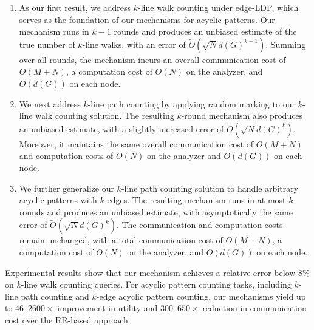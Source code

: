 \begin{enumerate}
\item 
As our first result, we address $k$-line walk counting under edge-LDP, which serves as the foundation of our mechanisms for acyclic patterns. 
Our mechanism runs in $k-1$ rounds and produces an unbiased estimate of the true number of $k$-line walks, with an error of $\tilde{O}(\sqrt{N} d(G)^{k-1})$.
Summing over all rounds, the mechanism incurs an overall communication cost of $O(M+N)$, a computation cost of $O(N)$ on the analyzer, and $O(d(G))$ on each node.


\item
We next address $k$-line path counting by applying random marking to our $k$-line walk counting solution.
The resulting $k$-round mechanism also produces an unbiased estimate, with a slightly increased error of $\tilde{O}(\sqrt{N}d(G)^k)$. 
Moreover, it maintains the same overall communication cost of $O(M+N)$ and computation costs of $O(N)$ on the analyzer and $O(d(G))$ on each node.


\item 
We further generalize our $k$-line path counting solution to handle arbitrary acyclic patterns with $k$ edges. 
The resulting mechanism runs in at most $k$ rounds and produces an unbiased estimate, with asymptotically the same error of $\tilde{O}(\sqrt{N} d(G)^k)$.
The communication and computation costs remain unchanged, with a total communication cost of $O(M+N)$, a computation cost of $O(N)$ on the analyzer, and $O(d(G))$ on each node.

\end{enumerate}



Experimental results show that our mechanism achieves a relative error below ${8}\%$ on $k$-line walk counting queries. 
For acyclic pattern counting tasks, including $k$-line path counting and $k$-edge acyclic pattern counting, our mechanisms yield up to ${46}$–${2600}\times$ improvement in utility and ${300}$–$650\times$ reduction in communication cost over the RR-based approach. 






